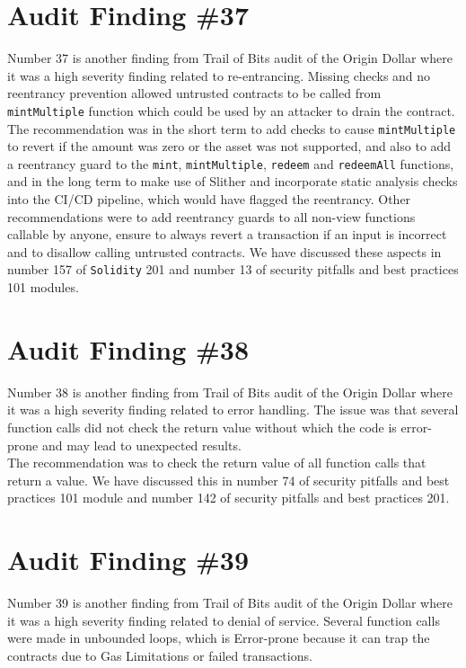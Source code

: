 \section{Audit Finding \#37}

Number 37 is another finding from Trail of Bits audit of the Origin Dollar where it was a high severity finding related to re-entrancing. Missing checks and no reentrancy prevention allowed untrusted contracts to be called from \verb|mintMultiple| function which could be used by an attacker to drain the contract. The recommendation was in the short term to add checks to cause \verb|mintMultiple| to revert if the amount was zero or the asset was not supported, and also to add a reentrancy guard to the \verb|mint|, \verb|mintMultiple|, \verb|redeem| and \verb|redeemAll| functions, and in the long term to make use of Slither and incorporate static analysis checks into the CI/CD pipeline, which would have flagged the reentrancy. Other recommendations were to add reentrancy guards to all non-view functions callable by anyone, ensure to always revert a transaction if an input is incorrect and to disallow calling untrusted contracts. We have discussed these aspects in number 157 of \verb|Solidity| 201 and number 13 of security pitfalls and best practices 101 modules.

\section{Audit Finding \#38}

Number 38 is another finding from Trail of Bits audit of the Origin Dollar where it was a high severity finding related to error handling. The issue was that several function calls did not check the return value without which the code is error-prone and may lead to unexpected results.\\

The recommendation was to check the return value of all function calls that return a value. We have discussed this in number 74 of security pitfalls and best practices 101 module and number 142 of security pitfalls and best practices 201.

\section{Audit Finding \#39}

Number 39 is another finding from Trail of Bits audit of the Origin Dollar where it was a high severity finding related to denial of service. Several function calls were made in unbounded loops, which is Error-prone because it can trap the contracts due to Gas Limitations or failed transactions.\\

